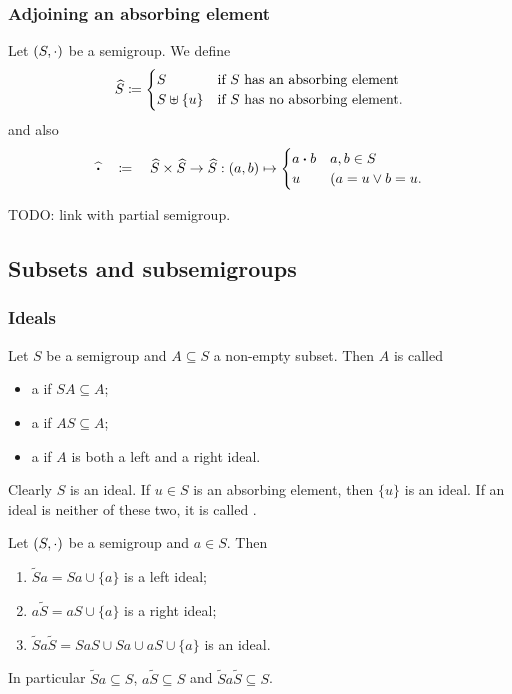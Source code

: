 \subsubsection{Adjoining an absorbing element}
\begin{definition}
Let $\left( S,\cdot \right)$ be a semigroup. We define
\[ \widehat{S} \coloneqq \begin{cases}
S & \text{if $S$ has an absorbing element} \\
S\uplus \{u\} & \text{if $S$ has no absorbing element.}
\end{cases} \]
and also
\[ \widehat{\boldsymbol{\cdot}} \quad\coloneqq\quad \widehat{S}\times \widehat{S}\to \widehat{S}: (a,b) \mapsto \begin{cases}
a\boldsymbol{\cdot} b & a,b\in S \\
u & (a = u \lor b = u.
\end{cases} \]
\end{definition}

TODO: link with partial semigroup.

\subsection{Subsets and subsemigroups}
\subsubsection{Ideals}
\begin{definition}
Let $S$ be a semigroup and $A\subseteq S$ a non-empty subset. Then $A$ is called
\begin{itemize}
\item a  if $SA \subseteq A$;
\item a  if $AS \subseteq A$;
\item a  if $A$ is both a left and a right ideal.
\end{itemize}
Clearly $S$ is an ideal. If $u\in S$ is an absorbing element, then $\{u\}$ is an ideal. If an ideal is neither of these two, it is called .
\end{definition}

\begin{lemma}
Let $\left( S,\cdot \right)$ be a semigroup and $a\in S$. Then
\begin{enumerate}
\item $\widetilde{S}a = Sa \cup \{a\}$ is a left ideal;
\item $a\widetilde{S} = aS \cup \{a\}$ is a right ideal;
\item $\widetilde{S}a\widetilde{S} = SaS \cup Sa \cup aS \cup \{a\}$ is an ideal.
\end{enumerate}
In particular $\widetilde{S}a \subseteq S$, $a\widetilde{S} \subseteq S$ and $\widetilde{S}a\widetilde{S} \subseteq S$.
\end{lemma}

